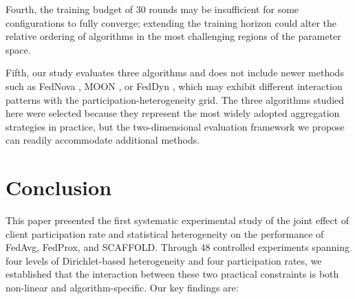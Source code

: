\documentclass[conference]{IEEEtran}
\begin{document}
Fourth, the training budget of 30 rounds may be insufficient for some configurations to fully converge; extending the training horizon could alter the relative ordering of algorithms in the most challenging regions of the parameter space.

Fifth, our study evaluates three algorithms and does not include newer methods such as FedNova \cite{wang2020fednova}, MOON \cite{li2021moon}, or FedDyn \cite{acar2021feddyn}, which may exhibit different interaction patterns with the participation-heterogeneity grid. The three algorithms studied here were selected because they represent the most widely adopted aggregation strategies in practice, but the two-dimensional evaluation framework we propose can readily accommodate additional methods.


\section{Conclusion}

This paper presented the first systematic experimental study of the joint effect of client participation rate and statistical heterogeneity on the performance of FedAvg, FedProx, and SCAFFOLD. Through 48 controlled experiments spanning four levels of Dirichlet-based heterogeneity and four participation rates, we established that the interaction between these two practical constraints is both non-linear and algorithm-specific. Our key findings are:
\end{document}
